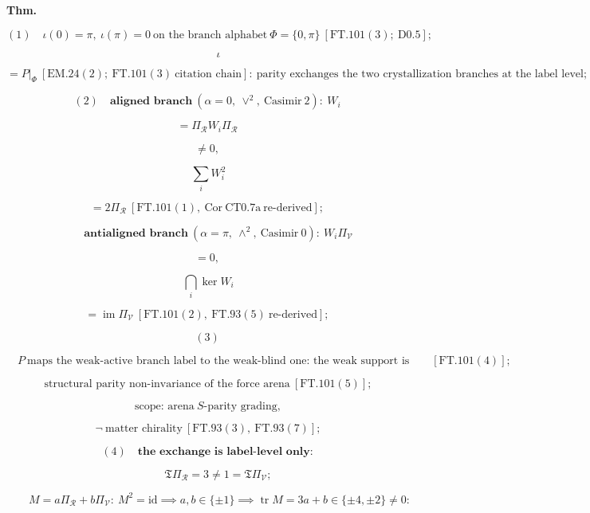 \begin{theorem}\label{tag:FT-135}
\textbf{Thm.}

\[
(1)\quad\iota(0)=\pi,\ \iota(\pi)=0\ \text{on the branch alphabet}\ \Phi=\{0,\pi\}\ [\mathrm{FT.101}(3);\ \mathrm{D0.5}];
\]

\[
\qquad \iota
\]

\[
= P|_{\Phi}\ [\mathrm{EM.24}(2);\ \mathrm{FT.101}(3)\ \text{citation chain}]:\ \text{parity exchanges the two crystallization branches at the label level};
\]

\[
(2)\quad\textbf{aligned branch}\ (\alpha=0,\ \vee^2,\ \text{Casimir}\ 2):\ W_i
\]

\[
= \Pi_{\mathcal R}W_i\Pi_{\mathcal R}
\]

\[
\ne 0,
\]

\[
\ \sum_iW_i^2
\]

\[
= 2\Pi_{\mathcal R}\ [\mathrm{FT.101}(1),\ \text{Cor}\ \mathrm{CT0.7a}\ \text{re-derived}];
\]

\[
\qquad \textbf{antialigned branch}\ (\alpha=\pi,\ \wedge^2,\ \text{Casimir}\ 0):\ W_i\Pi_{\mathcal V}
\]

\[
= 0,
\]

\[
\ \bigcap_i\ker W_i
\]

\[
= \operatorname{im}\Pi_{\mathcal V}\ [\mathrm{FT.101}(2),\ \mathrm{FT.93}(5)\ \text{re-derived}];
\]

\[
(3)
\]

\[
\quad P\ \text{maps the weak-active branch label to the weak-blind one: the weak support is not flip-invariant}\ [\mathrm{FT.101}(4)];
\]

\[
\ \text{structural parity non-invariance of the force arena}\ [\mathrm{FT.101}(5)];
\]

\[
\ \text{scope: arena}\ S\text{-parity grading},
\]

\[
\ \neg\ \text{matter chirality}\ [\mathrm{FT.93}(3),\ \mathrm{FT.93}(7)];
\]

\[
(4)\quad\textbf{the exchange is label-level only:}
\]

\[
\qquad \mathfrak T\Pi_{\mathcal R}=3\ne1=\mathfrak T\Pi_{\mathcal V};
\]

\[
\qquad M=a\Pi_{\mathcal R}+b\Pi_{\mathcal V}:\ M^2=\mathrm{id}\implies a,b\in\{\pm1\}\implies\operatorname{tr}M=3a+b\in\{\pm4,\pm2\}\ne0:
\]


\end{theorem}
